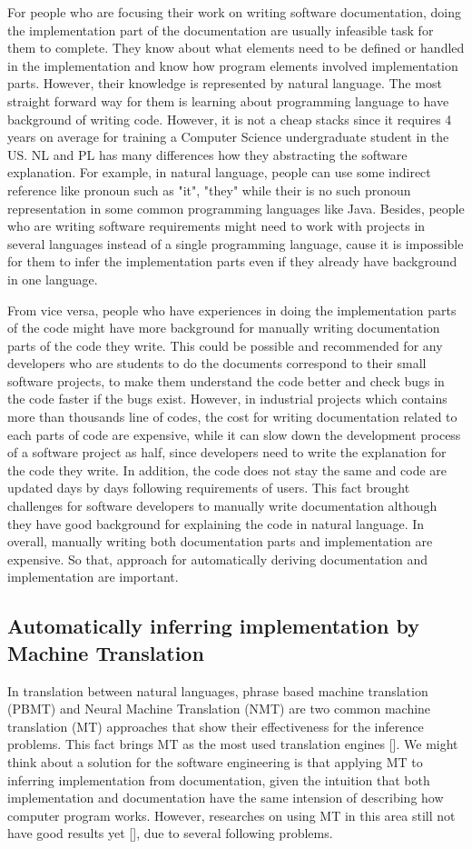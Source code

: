 For people who are focusing their work on writing software documentation, doing the implementation part of the documentation are usually infeasible task for them to complete. They know about what elements need to be defined or handled in the implementation and know how program elements involved implementation parts. However, their knowledge is represented by natural language. The most straight forward way for them is learning about programming language to have background of writing code. However, it is not a cheap stacks since it requires 4 years on average for training a Computer Science undergraduate student in the US. NL and PL has many differences how they abstracting the software explanation. For example, in natural language, people can use some indirect reference like pronoun such as "it", "they" while their is no such pronoun representation in some common programming languages like Java. Besides, people who are writing software requirements might need to work with projects in several languages instead of a single programming language, cause it is impossible for them to infer the implementation parts even if they already have background in one language.

From vice versa, people who have experiences in doing the implementation parts of the code might have more background for manually writing documentation parts of the code they write. This could be possible and recommended for any developers who are students to do the documents correspond to their small software projects, to make them understand the code better and check bugs in the code faster if the bugs exist. However, in industrial projects which contains more than thousands line of codes, the cost for writing documentation related to each parts of code are expensive, while it can slow down the development process of a software project as half, since developers need to write the explanation for the code they write. In addition, the code does not stay the same and code are updated days by days following requirements of users. This fact brought challenges for software developers to manually write documentation although they have good background for explaining the code in natural language. In overall, manually writing both documentation parts and implementation  are expensive. So that, approach for automatically deriving documentation and implementation are important.

\subsection{Automatically  inferring implementation by Machine Translation }
 In translation between natural languages, phrase based machine translation (PBMT) and Neural Machine Translation (NMT) are two common machine translation (MT) approaches that show their effectiveness for the inference problems. This fact brings MT as the most used translation engines [\cite{8416973}]. We might think about a solution for the software engineering is that applying MT to inferring implementation from documentation, given the intuition that both implementation and documentation have the same intension of describing how computer program works. However, researches on using MT in this area still not have good results yet [\cite{DBLP:journals/corr/BaroneS17}], due to several following problems.
